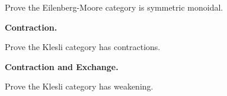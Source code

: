 Prove the Eilenberg-Moore category is symmetric monoidal.

\textbf{Contraction.}

Prove the Klesli category has contractions.

\textbf{Contraction and Exchange.}

Prove the Klesli category has weakening.


